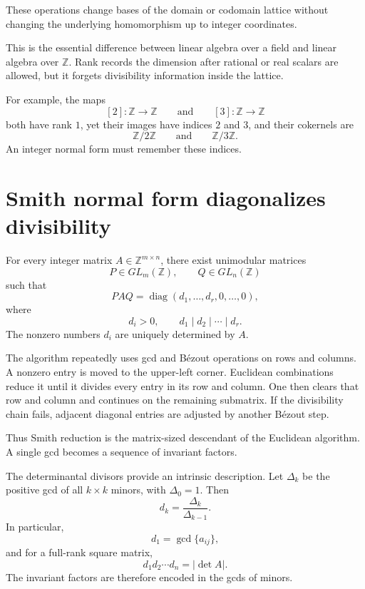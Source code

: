 These operations change bases of the domain or codomain lattice without changing the underlying homomorphism up to integer coordinates.

This is the essential difference between linear algebra over a field and linear algebra over \(\mathbb Z\).  Rank records the dimension after rational or real scalars are allowed, but it forgets divisibility information inside the lattice.

For example, the maps
\[
  [2]:\mathbb Z\to\mathbb Z
  \qquad\text{and}\qquad
  [3]:\mathbb Z\to\mathbb Z
\]
both have rank \(1\), yet their images have indices \(2\) and \(3\), and their cokernels are
\[
  \mathbb Z/2\mathbb Z
  \qquad\text{and}\qquad
  \mathbb Z/3\mathbb Z.
\]
An integer normal form must remember these indices.

\section{Smith normal form diagonalizes divisibility}

\begin{theorem}
For every integer matrix \(A\in\mathbb Z^{m\times n}\), there exist unimodular matrices
\[
  P\in GL_m(\mathbb Z),
  \qquad
  Q\in GL_n(\mathbb Z)
\]
such that
\[
  PAQ
  =
  \operatorname{diag}(d_1,\ldots,d_r,0,\ldots,0),
\]
where
\[
  d_i>0,
  \qquad
  d_1\mid d_2\mid\cdots\mid d_r.
\]
The nonzero numbers \(d_i\) are uniquely determined by \(A\).
\end{theorem}

The algorithm repeatedly uses gcd and Bézout operations on rows and columns.  A nonzero entry is moved to the upper-left corner.  Euclidean combinations reduce it until it divides every entry in its row and column.  One then clears that row and column and continues on the remaining submatrix.  If the divisibility chain fails, adjacent diagonal entries are adjusted by another Bézout step.

Thus Smith reduction is the matrix-sized descendant of the Euclidean algorithm.  A single gcd becomes a sequence of invariant factors.

The determinantal divisors provide an intrinsic description.  Let \(\Delta_k\) be the positive gcd of all \(k\times k\) minors, with \(\Delta_0=1\).  Then
\[
  d_k=\frac{\Delta_k}{\Delta_{k-1}}.
\]
In particular,
\[
  d_1=\gcd\{a_{ij}\},
\]
and for a full-rank square matrix,
\[
  d_1d_2\cdots d_n=|\det A|.
\]
The invariant factors are therefore encoded in the gcds of minors.

